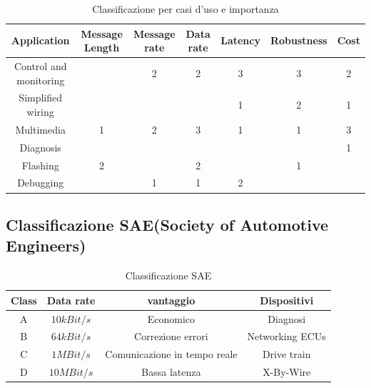 \begin{table}[!ht]
	\begin{adjustbox}{width=\columnwidth,center}
		\begin{tabular}{|c|c|c|c|c|c|c|}
			\hline
			Application            & Message Length & Message rate & Data rate & Latency & Robustness & Cost \\
			\hline
			Control and monitoring &                & 2            & 2         & 3       & 3          & 2    \\
			\hline
			Simplified wiring      &                &              &           & 1       & 2          & 1    \\
			\hline
			Multimedia             & 1              & 2            & 3         & 1       & 1          & 3    \\
			\hline
			Diagnosis              &                &              &           &         &            & 1    \\
			\hline
			Flashing               & 2              &              & 2         &         & 1          &      \\
			\hline
			Debugging              &                & 1            & 1         & 2       &            &      \\
			\hline
		\end{tabular}
	\end{adjustbox}
	\caption{Classificazione per casi d'uso e importanza}
	\label{tab:classification_use_case}
\end{table}


\subsection{Classificazione SAE(Society of Automotive Engineers)}

\begin{table}
	\begin{adjustbox}{width=\columnwidth, center}
		\begin{tabular}{|c|c|c|c|}
			\hline
			Class & Data rate  & vantaggio                    & Dispositivi     \\
			\hline
			A     & $10kBit/s$ & Economico                    & Diagnosi        \\
			B     & $64kBit/s$ & Correzione errori            & Networking ECUs \\
			C     & $1MBit/s$  & Comunicazione in tempo reale & Drive train     \\
			D     & $10MBit/s$ & Bassa latenza                & X-By-Wire       \\
			\hline
		\end{tabular}
	\end{adjustbox}
	\caption{Classificazione SAE}
	\label{tab:classification_sae}
\end{table}



